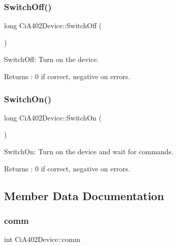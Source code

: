\subsubsection{\texorpdfstring{Switch\+Off()}{SwitchOff()}}
{\footnotesize\ttfamily long Ci\+A402\+Device\+::\+Switch\+Off (\begin{DoxyParamCaption}{ }\end{DoxyParamCaption})}



Switch\+Off\+: Turn on the device. 

\begin{DoxyReturn}{Returns}
\+: 0 if correct, negative on errors. 
\end{DoxyReturn}
\mbox{\label{classCiA402Device_ab77bce0d7f42429f5f8f092aacb02754}} 
\subsubsection{\texorpdfstring{Switch\+On()}{SwitchOn()}}
{\footnotesize\ttfamily long Ci\+A402\+Device\+::\+Switch\+On (\begin{DoxyParamCaption}{ }\end{DoxyParamCaption})}



Switch\+On\+: Turn on the device and wait for commands. 

\begin{DoxyReturn}{Returns}
\+: 0 if correct, negative on errors. 
\end{DoxyReturn}


\subsection{Member Data Documentation}
\mbox{\label{classCiA402Device_a4e7a5a225fb27f5f02aeb0e6df38cd1f}} 
\subsubsection{\texorpdfstring{comm}{comm}}
{\footnotesize\ttfamily int Ci\+A402\+Device\+::comm\hspace{0.3cm}{\ttfamily [private]}}


